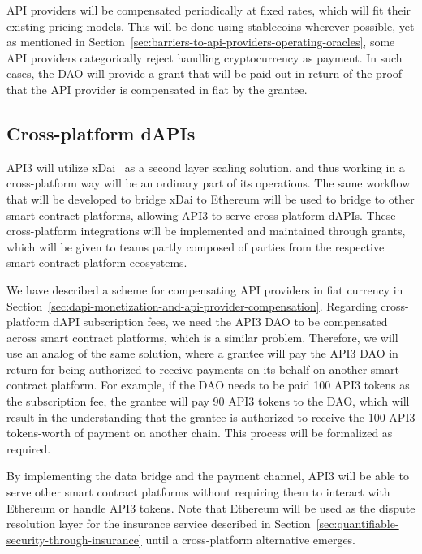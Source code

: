 \documentclass[11pt]{article}
\begin{document}
API providers will be compensated periodically at fixed rates, which will fit their existing pricing models.
This will be done using stablecoins wherever possible, yet as mentioned in Section~\ref{sec:barriers-to-api-providers-operating-oracles}, some API providers categorically reject handling cryptocurrency as payment.
In such cases, the DAO will provide a grant that will be paid out in return of the proof that the API provider is compensated in fiat by the grantee.

\subsection{Cross-platform dAPIs}
\label{sec:cross-platform-dapis}

API3 will utilize xDai~\cite{xdai:2019} as a second layer scaling solution, and thus working in a cross-platform way will be an ordinary part of its operations.
The same workflow that will be developed to bridge xDai to Ethereum will be used to bridge to other smart contract platforms, allowing API3 to serve cross-platform dAPIs.
These cross-platform integrations will be implemented and maintained through grants, which will be given to teams partly composed of parties from the respective smart contract platform ecosystems.

We have described a scheme for compensating API providers in fiat currency in Section~\ref{sec:dapi-monetization-and-api-provider-compensation}.
Regarding cross-platform dAPI subscription fees, we need the API3 DAO to be compensated across smart contract platforms, which is a similar problem.
Therefore, we will use an analog of the same solution, where a grantee will pay the API3 DAO in return for being authorized to receive payments on its behalf on another smart contract platform.
For example, if the DAO needs to be paid 100 API3 tokens as the subscription fee, the grantee will pay 90 API3 tokens to the DAO, which will result in the understanding that the grantee is authorized to receive the 100 API3 tokens-worth of payment on another chain.
This process will be formalized as required.

By implementing the data bridge and the payment channel, API3 will be able to serve other smart contract platforms without requiring them to interact with Ethereum or handle API3 tokens.
Note that Ethereum will be used as the dispute resolution layer for the insurance service described in Section~\ref{sec:quantifiable-security-through-insurance} until a cross-platform alternative emerges.
\end{document}
